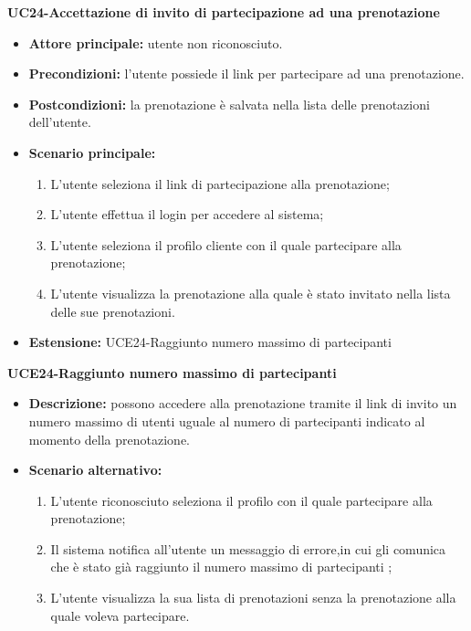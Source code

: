 \textbf{UC24-Accettazione di invito di partecipazione ad una prenotazione}
\begin{itemize}
    \item \textbf{Attore principale: } utente non riconosciuto.
    \item \textbf{Precondizioni: }l'utente possiede il link per partecipare ad una prenotazione.
    \item \textbf{Postcondizioni: }la prenotazione è salvata nella lista delle prenotazioni dell'utente.
    \item \textbf{Scenario principale:} 
        \begin{enumerate}
            \item L'utente seleziona il link di partecipazione alla prenotazione;
            \item L'utente effettua il login per accedere al sistema;
            \item L'utente seleziona il profilo cliente con il quale partecipare alla prenotazione;
            \item L'utente visualizza la prenotazione alla quale è stato invitato nella lista delle sue
            prenotazioni.
        \end{enumerate}
        \item \textbf{Estensione: }UCE24-Raggiunto numero massimo di partecipanti
    \end{itemize}

\textbf{UCE24-Raggiunto numero massimo di partecipanti}
\begin{itemize}
    \item \textbf{Descrizione: }possono accedere alla prenotazione tramite il link di
    invito un numero massimo di utenti uguale al numero di partecipanti indicato al momento della
    prenotazione.
    \item \textbf{Scenario alternativo: }
    \begin{enumerate}
        \item L'utente riconosciuto seleziona il profilo con il quale partecipare alla prenotazione;
        \item Il sistema notifica all'utente un messaggio di errore,in cui gli comunica che è stato
        già raggiunto il numero massimo di partecipanti ;
        \item L'utente visualizza la sua lista di prenotazioni senza la prenotazione alla quale voleva
        partecipare.
    \end{enumerate}
\end{itemize}

